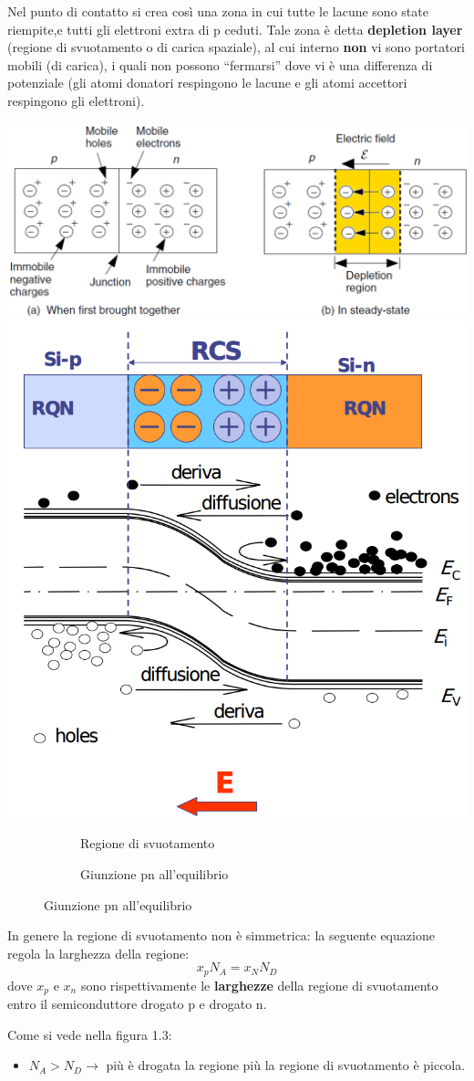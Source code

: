 \documentclass[
]{book}
\providecommand{\tightlist}{%
  \setlength{\itemsep}{0pt}\setlength{\parskip}{0pt}}
\begin{document}
Nel punto di contatto si crea così una zona in cui tutte le lacune sono
state riempite,e tutti gli elettroni extra di p ceduti. Tale zona è
detta \textbf{depletion layer} (regione di svuotamento o di carica
spaziale), al cui interno \textbf{non} vi sono portatori mobili (di
carica), i quali non possono ``fermarsi'' dove vi è una differenza di
potenziale (gli atomi donatori respingono le lacune e gli atomi
accettori respingono gli elettroni).

\includegraphics[width=0.5\linewidth,height=\textheight,keepaspectratio]{immagini/1.png}
\includegraphics[width=0.25\linewidth,height=\textheight,keepaspectratio]{immagini/pn_equilibrio.png}

\begin{figure}[!h]
\begin{subfigure}[t]{0.4\linewidth}
\caption{Regione di svuotamento}
\end{subfigure}
\begin{subfigure}[t]{0.4\linewidth}
\caption{Giunzione pn all'equilibrio}
\end{subfigure}
\end{figure}

In genere la regione di svuotamento non è simmetrica: la seguente
equazione regola la larghezza della regione: \[
x_p N_A = x_N N_D
\] dove \(x_p\) e \(x_n\) sono rispettivamente le \textbf{larghezze}
della regione di svuotamento entro il semiconduttore drogato p e drogato
n.

Come si vede nella figura 1.3:

\begin{itemize}
\tightlist
\item
  \(N_A > N_D \to\) più è drogata la regione più la regione di
  svuotamento è piccola.
\end{itemize}
\end{document}
